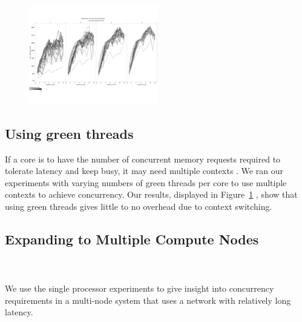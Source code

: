\begin{figure}
	\begin{center}
 		\includegraphics[width=0.5\textwidth]{figures/multi-core-green-thread-1gb.pdf}
	\end{center}
	\caption{}
	\label{fig:listwalk-green-threads}
\end{figure}

\subsection{Using green threads}
	If a core is to have the number of concurrent memory requests required to tolerate latency and keep busy, it may need multiple contexts .  We ran our experiments with varying numbers of green threads per core to use multiple contexts to achieve concurrency. Our results, displayed in Figure~\ref{fig:listwalk-green-threads} , show that using green threads gives little to no overhead due to context switching. 


\subsection{Expanding to Multiple Compute Nodes}
	\\
	\\
	We use the single processor experiments to give insight into concurrency requirements in a multi-node system that uses a network with relatively long latency. 
	
